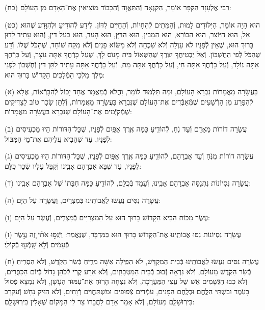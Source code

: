 \documentclass[twoside, openany, parskip=half, 11pt]{book}
\begin{document}
(כח)
רַבִּי אֶלְעָזָר הַקַּפָּר אוֹמֵר, הַקִּנְאָה וְֿהַתַּאֲוָה וְֿהַכָּבוֹד מוֹצִיאִין אֶת־הָאָדָם מִן הָעוֹלָם:

(כט)
הוּא הָיָה אוֹמֵר, הַיִּלּוֹדִים לָמוּת,
וְֿהַמֵּתִים לְֿהֵחָיוֹת,
וְֿהַחַיִּים לִדּוֹן.
לֵידַע לְֿהוֹדִיעַ וּלְהִוָּדַע שֶׁהוּא אֵל, הוּא הַיּוֹצֵר, הוּא הַבּוֹרֵא, הוּא הַמֵּבִין, הוּא הַדַּיָּן, הוּא הָעֵד, הוּא בַּעַל דִּין, וְֿהוּא עָתִיד לָדוּן בָּרוּךְ הוּא, שֶׁאֵין לְֿפָנָיו לֹא עַוְלָה וְֿלֹא שִׁכְחָה וְֿלֹא מַשּׂוֹא פָנִים וְֿלֹא מִקַּח שׁוֹחַד, שֶׁהַכֹּל שֶׁלּוֹ.
וְֿדַע שֶׁהַכֹּל לְֿפִי הַחֶשְׁבּוֹן.
וְֿאַל יַבְטִיחֲךָ יִצְרֶךָ שֶׁהַשְּׁאוֹל בֵּית מָנוֹס לָךְ, שֶׁעַל כָּרְֿחֲךָ אַתָּה נוֹצָר,
וְֿעַל כָּרְֿחֲךָ אַתָּה נוֹלָד,
וְֿעַל כָּרְֿחֲךָ אַתָּה חַי,
וְֿעַל כָרְֿחֲךָ אַתָּה מֵת,
וְֿעַל כָּרְֿחֲךָ אַתָּה עָתִיד לִתֵּן דִּין וְֿחֶשְׁבּוֹן לִפְנֵי מֶלֶךְ מַלְכֵי הַמְּֿלָכִים הַקָּדוֹשׁ בָּרוּךְ הוּא:




\kolyisroel

(א)
בַּעֲשָׂרָה מַאֲמָרוֹת נִבְרָא הָעוֹלָם, וּמַה תַּלְמוּד לוֹמַר, וַהֲלֹא בְֿמַאֲמָר אֶחָד יָכוֹל לְֿהִבָּרְֿאוֹת, אֶלָּא לְֿהִפָּרַע מִן הָרְֿשָׁעִים שֶׁמְּֿאַבְּֿדִים אֶת־הָעוֹלָם שֶׁנִּבְרָא בַּעֲשָׂרָה מַאֲמָרוֹת, וְֿלִתֵּן שָׂכָר טוֹב לַצַּדִּיקִים שֶׁמְּֿקַיְּֿמִים אֶת־הָעוֹלָם שֶׁנִּבְרָא בַּעֲשָׂרָה מַאֲמָרוֹת:



(ב)
עֲשָׂרָה דוֹרוֹת מֵאָדָם וְֿעַד נֹֽחַ, לְֿהוֹדִֽיעַ כַּמָּה אֶֽרֶךְ אַפַּֽיִם לְֿפָנָיו, שֶׁכׇּל־הַדּוֹרוֹת הָיוּ מַכְעִיסִים לְֿפָנָיו, עַד שֶׁהֵבִיא עֲלֵיהֶם אֶת־מֵי הַמַּבּוּל:

(ג)
עֲשָׂרָה דוֹרוֹת מִנֹּֽחַ וְֿעַד אַבְרָהָם, לְֿהוֹדִֽיעַ כַּמָּה אֶֽרֶךְ אַפַּֽיִם לְֿפָנָיו, שֶׁכׇּל־הַדּוֹרוֹת הָיוּ מַכְעִיסִים לְֿפָנָיו, עַד שֶׁבָּא אַבְרָהָם אָבִֽינוּ וְֿקִבֵּל עָלָיו שְֿׂכַר כֻּלָּם:

(ד)
עֲשָׂרָה נִסְיוֹנוֹת נִתְנַסָּה אַבְרָהָם אָבִֽינוּ, וְֿעָמַד בְּֿכֻלָּם, לְֿהוֹדִֽיעַ כַּמָּה חִבָּתוֹ שֶׁל אַבְרָהָם אָבִֽינוּ:

(ה)
עֲשָׂרָה נִסִּים נַעֲשׂוּ לַאֲבוֹתֵֽינוּ בְּֿמִצְרַיִם, וַעֲשָׂרָה עַל הַיָּם:

(ו)
עֶשֶׂר מַכּוֹת הֵבִיא הַקָּדוֹשׁ בָּרוּךְ הוּא עַל הַמִּצְרִיִּים בְּֿמִצְרַֽיִם, וְֿעֶשֶׂר עַל הַיָּם:

(ז)
עֲשָׂרָה נִסְיוֹנוֹת נִסּוּ אֲבוֹתֵֽינוּ אֶת־הַקָּדוֹשׁ בָּרוּךְ הוּא בַּמִּדְבָּר, שֶׁנֶּאֱמַר: וַיְֿנַסּ֣וּ אֹתִ֗י זֶ֚ה עֶ֣שֶׂר פְּֿעָמִ֔ים וְֿלֹ֥א שָֽׁמְֿע֖וּ בְּֿקוֹלִֽי׃

(ח)
עֲשָׂרָה נִסִּים נַעֲשׂוּ לַאֲבוֹתֵֽינוּ בְּֿבֵית הַמִּקְדָּשׁ, לֹא הִפִּֽילָה אִשָּׁה מֵרֵֽיחַ בְּֿשַׂר הַקֹּֽדֶשׁ, וְֿלֹא הִסְרִֽיחַ בְּֿשַׂר הַקֹּֽדֶשׁ מֵעוֹלָם, וְֿלֹא נִרְאָה זְֿבוּב בְּֿבֵית הַמַּטְבָּחַֽיִם, וְֿלֹא אִרָע קֶֽרִי לְֿכֹהֵן גָּדוֹל בְּֿיוֹם הַכִּפֻּרִים, וְֿלֹא כִבּוּ הַגְּֿשָׁמִים אֵשׁ שֶׁל עֲצֵי הַמַּעֲרָכָה, וְֿלֹא נִצְחָה הָרֽוּחַ אֶת־עַמּוּד הֶעָשָׁן, וְֿלֹא נִמְצָא פְֿסוּל בָּעֹֽמֶר וּבִשְׁתֵּי הַלֶּֽחֶם וּבְלֶֽחֶם הַפָּנִים, עֹמְֿדִים צְֿפוּפִים וּמִשְׁתַּחֲוִים רְֿוָחִים, וְֿלֹא הִזִּיק נָחָשׁ וְֿעַקְרָב בִּירֽוּשָׁלַֽםִ מֵעוֹלָם, וְֿלֹא אָמַר אָדָם לַחֲבֵרוֹ צַר לִי הַמָּקוֹם שֶׁאָלִין בִּירֽוּשָׁלָֽםִ:
\end{document}
